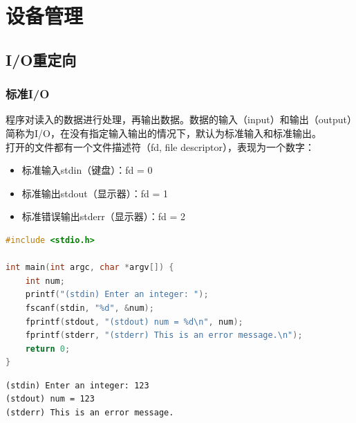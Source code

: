 \chapter{设备管理}

\section{I/O重定向}

\subsection{标准I/O}

程序对读入的数据进行处理，再输出数据。数据的输入（input）和输出（output）简称为I/O，在没有指定输入输出的情况下，默认为标准输入和标准输出。\\

打开的文件都有一个文件描述符（fd, file descriptor），表现为一个数字：

\begin{itemize}
	\item 标准输入stdin（键盘）：fd = 0
	\item 标准输出stdout（显示器）：fd = 1
	\item 标准错误输出stderr（显示器）：fd = 2
\end{itemize}

\vspace{0.5cm}


\begin{lstlisting}[language=C]
#include <stdio.h>

int main(int argc, char *argv[]) {
    int num;
    printf("(stdin) Enter an integer: ");
    fscanf(stdin, "%d", &num);
    fprintf(stdout, "(stdout) num = %d\n", num);
    fprintf(stderr, "(stderr) This is an error message.\n");
    return 0;
}
\end{lstlisting}

\begin{tcolorbox}
	\begin{verbatim}
(stdin) Enter an integer: 123
(stdout) num = 123
(stderr) This is an error message.
	\end{verbatim}
\end{tcolorbox}

\vspace{0.5cm}


